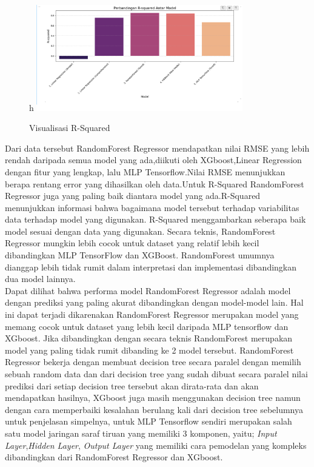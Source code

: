 \begin{figure}{h}
    \centering
    \includegraphics[width=0.8\textwidth]{images/r-squared.png}
    \caption{Visualisasi R-Squared}
    \label{fig:hasil}
\end{figure}

Dari data tersebut RandomForest Regressor mendapatkan nilai RMSE yang lebih rendah daripada semua model yang ada,diikuti oleh XGboost,Linear Regression
dengan fitur yang lengkap, lalu MLP Tensorflow.Nilai RMSE menunjukkan berapa rentang error yang dihasilkan oleh data.Untuk R-Squared RandomForest Regressor
juga yang paling baik diantara model yang ada.R-Squared menunjukkan informasi bahwa bagaimana model tersebut terhadap variabilitas data terhadap model yang 
digunakan. R-Squared menggambarkan seberapa baik model sesuai dengan data yang digunakan.
Secara teknis, RandomForest Regressor mungkin lebih cocok untuk dataset yang relatif lebih kecil dibandingkan MLP TensorFlow dan XGBoost. 
RandomForest umumnya dianggap lebih tidak rumit dalam interpretasi dan implementasi dibandingkan dua model lainnya.\\

Dapat dilihat bahwa performa model RandomForest Regressor adalah model dengan prediksi yang paling akurat dibandingkan dengan model-model lain.
Hal ini dapat terjadi dikarenakan RandomForest Regressor merupakan model yang memang cocok untuk dataset yang lebih kecil daripada MLP tensorflow
dan XGboost. Jika dibandingkan dengan secara teknis RandomForest merupakan model yang paling tidak rumit dibanding ke 2 model tersebut. RandomForest
Regressor bekerja dengan membuat decision tree secara paralel dengan memilih sebuah random data dan dari decision tree yang sudah dibuat secara paralel
nilai prediksi dari setiap decision tree tersebut akan dirata-rata dan akan mendapatkan hasilnya, XGboost juga masih menggunakan decision tree
namun dengan cara memperbaiki kesalahan berulang kali dari decision tree sebelumnya untuk penjelasan simpelnya, untuk MLP Tensorflow sendiri merupakan
salah satu model jaringan saraf tiruan yang memiliki 3 komponen, yaitu; \textit{Input Layer},\textit{Hidden Layer}, \textit{Output Layer} yang memiliki
cara pemodelan yang kompleks dibandingkan dari RandomForest Regressor dan XGboost. 

